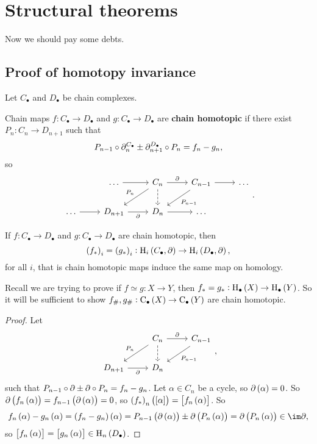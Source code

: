 \pagebreak

\section{Structural theorems}

Now we should pay some debts.

\subsection{Proof of homotopy invariance}

Let $ C_\bullet $ and $ D_\bullet $ be chain complexes.

\begin{definition*}
Chain maps $ f : C_\bullet \to D_\bullet $ and $ g : C_\bullet \to D_\bullet $ are \textbf{chain homotopic} if there exist $ P_n : C_n \to D_{n + 1} $ such that
$$ P_{n - 1} \circ \partial_n^{C_\bullet} \pm \partial_{n + 1}^{D_\bullet} \circ P_n = f_n - g_n, $$
so
$$
\begin{tikzcd}
& \dots \arrow{r} & C_n \arrow{r}{\da} \arrow{dl}[swap]{P_n} \arrow[dashed]{d} & C_{n - 1} \arrow{r} \arrow{dl}{P_{n - 1}} & \dots \\
\dots \arrow{r} & D_{n + 1} \arrow{r}[swap]{\da} & D_n \arrow{r} & \dots &
\end{tikzcd}.
$$
\end{definition*}

\begin{lemma}
If $ f : C_\bullet \to D_\bullet $ and $ g : C_\bullet \to D_\bullet $ are chain homotopic, then
$$ \br{f_*}_i = \br{g_*}_i : \H_i\br{C_\bullet, \da} \to \H_i\br{D_\bullet, \da}, $$
for all $ i $, that is chain homotopic maps induce the same map on homology.
\end{lemma}

Recall we are trying to prove if $ f \simeq g : X \to Y $, then $ f_* = g_* : \H_\bullet\br{X} \to \H_\bullet\br{Y} $. So it will be sufficient to show $ f_\#, g_\# : \C_\bullet\br{X} \to \C_\bullet\br{Y} $ are chain homotopic.

\begin{proof}
Let
$$
\begin{tikzcd}
& C_n \arrow{r}{\da} \arrow{dl}[swap]{P_n} \arrow[dashed]{d} & C_{n - 1} \arrow{dl}{P_{n - 1}} \\
D_{n + 1} \arrow{r}[swap]{\da} & D_n &
\end{tikzcd},
$$
such that $ P_{n - 1} \circ \partial \pm \partial \circ P_n = f_n - g_n $. Let $ \alpha \in C_n $ be a cycle, so $ \da\br{\alpha} = 0 $. So $ \da\br{f_n\br{\alpha}} = f_{n - 1}\br{\da\br{\alpha}} = 0 $, so $ \br{f_*}_n\br{\sbr{\alpha}} = \sbr{f_n\br{\alpha}} $. So
$$ f_n\br{\alpha} - g_n\br{\alpha} = \br{f_n - g_n}\br{\alpha} = P_{n - 1}\br{\da\br{\alpha}} \pm \da\br{P_n\br{\alpha}} = \da\br{P_n\br{\alpha}} \in \im \da, $$
so $ \sbr{f_n\br{\alpha}} = \sbr{g_n\br{\alpha}} \in \H_n\br{D_\bullet} $.
\end{proof}

